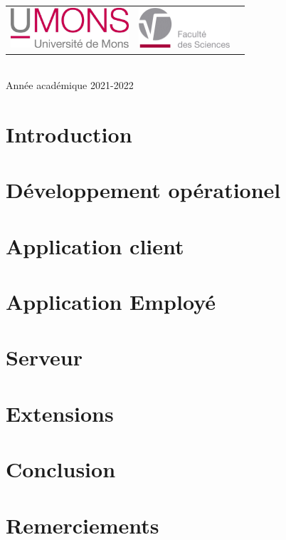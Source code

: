 \documentclass{article}
\begin{document}
\begin{titlepage}
\begin{center}
        \begin{center}
            \begin{tabular}[t]{c c c}
                \includegraphics[height=1.5cm]{ressources/logoumons.jpg} &
                \includegraphics[height=1.5cm]{ressources/logofs.jpg} &
            \end{tabular}
        \end{center}~\\
        
        {\large Année académique 2021-2022}
        
    \end{center}
\end{titlepage}

\tableofcontents
\newpage


\section{Introduction}


\section{Développement opérationel}


\section{Application client}


\section{Application Employé}


\section{Serveur}


\section{Extensions}


\section{Conclusion}


\section{Remerciements}

\end{document}
